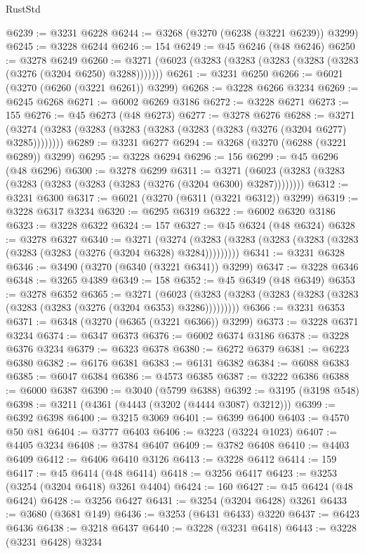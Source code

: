 \begin{lexlean}{RustStd}
\begin{coremodule}
@6239 := @3231 @6228
@6244 := @3268 (@3270 (@6238 (@3221 @6239)) @3299)
@6245 := @3228 @6244
@6246 := 154
@6249 := @45 @6246 (@48 @6246)
@6250 := @3278 @6249
@6260 := @3271 (@6023 (@3283 (@3283 (@3283 (@3283 (@3283 (@3276 (@3204 @6250) @3288)))))))
@6261 := @3231 @6250
@6266 := @6021 (@3270 (@6260 (@3221 @6261)) @3299)
@6268 := @3228 @6266 @3234
@6269 := @6245 @6268
@6271 := @6002 @6269 @3186
@6272 := @3228 @6271
@6273 := 155
@6276 := @45 @6273 (@48 @6273)
@6277 := @3278 @6276
@6288 := @3271 (@3274 (@3283 (@3283 (@3283 (@3283 (@3283 (@3283 (@3276 (@3204 @6277) @3285))))))))
@6289 := @3231 @6277
@6294 := @3268 (@3270 (@6288 (@3221 @6289)) @3299)
@6295 := @3228 @6294
@6296 := 156
@6299 := @45 @6296 (@48 @6296)
@6300 := @3278 @6299
@6311 := @3271 (@6023 (@3283 (@3283 (@3283 (@3283 (@3283 (@3283 (@3276 (@3204 @6300) @3287))))))))
@6312 := @3231 @6300
@6317 := @6021 (@3270 (@6311 (@3221 @6312)) @3299)
@6319 := @3228 @6317 @3234
@6320 := @6295 @6319
@6322 := @6002 @6320 @3186
@6323 := @3228 @6322
@6324 := 157
@6327 := @45 @6324 (@48 @6324)
@6328 := @3278 @6327
@6340 := @3271
    (@3274 (@3283 (@3283 (@3283 (@3283 (@3283 (@3283 (@3283 (@3276 (@3204 @6328) @3284)))))))))
@6341 := @3231 @6328
@6346 := @3490 (@3270 (@6340 (@3221 @6341)) @3299)
@6347 := @3228 @6346
@6348 := @3265 @4389
@6349 := 158
@6352 := @45 @6349 (@48 @6349)
@6353 := @3278 @6352
@6365 := @3271
    (@6023 (@3283 (@3283 (@3283 (@3283 (@3283 (@3283 (@3283 (@3276 (@3204 @6353) @3286)))))))))
@6366 := @3231 @6353
@6371 := @6348 (@3270 (@6365 (@3221 @6366)) @3299)
@6373 := @3228 @6371 @3234
@6374 := @6347 @6373
@6376 := @6002 @6374 @3186
@6378 := @3228 @6376 @3234
@6379 := @6323 @6378
@6380 := @6272 @6379
@6381 := @6223 @6380
@6382 := @6176 @6381
@6383 := @6131 @6382
@6384 := @6088 @6383
@6385 := @6047 @6384
@6386 := @4573 @6385
@6387 := @3222 @6386
@6388 := @6000 @6387
@6390 := @3040 (@5799 @6388)
@6392 := @3195 (@3198 @548)
@6398 := @3211 (@4361 (@4443 (@3202 (@4444 @3087) @3212)))
@6399 := @6392 @6398
@6400 := @3215 @3069
@6401 := @6399 @6400
@6403 := @4570 @50 @81
@6404 := @3777 @6403
@6406 := @3223 (@3224 @1023)
@6407 := @4405 @3234
@6408 := @3784 @6407
@6409 := @3782 @6408
@6410 := @4403 @6409
@6412 := @6406 @6410 @3126
@6413 := @3228 @6412
@6414 := 159
@6417 := @45 @6414 (@48 @6414)
@6418 := @3256 @6417
@6423 := @3253 (@3254 (@3204 @6418) @3261 @4404)
@6424 := 160
@6427 := @45 @6424 (@48 @6424)
@6428 := @3256 @6427
@6431 := @3254 (@3204 @6428) @3261
@6433 := @3680 (@3681 @149)
@6436 := @3253 (@6431 @6433) @3220
@6437 := @6423 @6436
@6438 := @3218 @6437
@6440 := @3228 (@3231 @6418)
@6443 := @3228 (@3231 @6428) @3234

\end{coremodule}
\end{lexlean}
